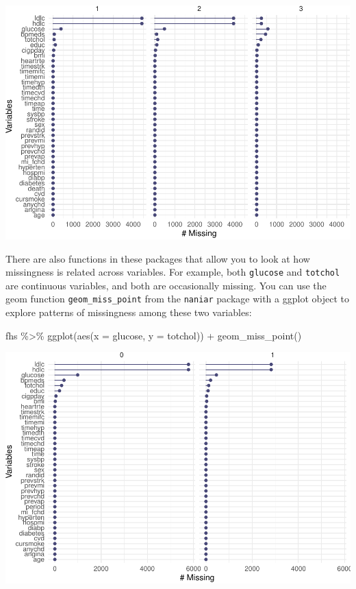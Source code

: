 \documentclass[
]{book}
\newenvironment{Shaded}{\begin{snugshade}}{\end{snugshade}}
\newcommand{\AttributeTok}[1]{\textcolor[rgb]{0.77,0.63,0.00}{#1}}
\newcommand{\FunctionTok}[1]{\textcolor[rgb]{0.00,0.00,0.00}{#1}}
\newcommand{\NormalTok}[1]{#1}
\newcommand{\SpecialCharTok}[1]{\textcolor[rgb]{0.00,0.00,0.00}{#1}}
\begin{document}
\includegraphics{adv_epi_analysis_files/figure-latex/unnamed-chunk-76-1.pdf}

There are also functions in these packages that allow you to look at how
missingness is related across variables. For example, both \texttt{glucose} and
\texttt{totchol} are continuous variables, and both are occasionally missing. You
can use the geom function \texttt{geom\_miss\_point} from the \texttt{naniar} package
with a ggplot object to explore patterns of missingness among these two
variables:

\begin{Shaded}
\begin{Highlighting}[]
\NormalTok{fhs }\SpecialCharTok{\%\textgreater{}\%} 
  \FunctionTok{ggplot}\NormalTok{(}\FunctionTok{aes}\NormalTok{(}\AttributeTok{x =}\NormalTok{ glucose, }\AttributeTok{y =}\NormalTok{ totchol)) }\SpecialCharTok{+} 
  \FunctionTok{geom\_miss\_point}\NormalTok{()}
\end{Highlighting}
\end{Shaded}

\includegraphics{adv_epi_analysis_files/figure-latex/unnamed-chunk-77-1.pdf}
\end{document}
